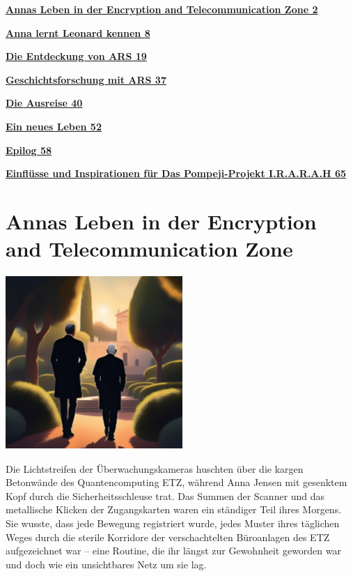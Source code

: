 \documentclass[
]{article}
\begin{document}
\hyperref[annas-leben-in-der-encryption-and-telecommunication-zone]{\textbf{Annas
Leben in der Encryption and Telecommunication Zone 2}}

\hyperref[anna-lernt-leonard-kennen]{\textbf{Anna lernt Leonard kennen
8}}

\hyperref[die-entdeckung-von-ars]{\textbf{Die Entdeckung von ARS 19}}

\hyperref[geschichtsforschung-mit-ars]{\textbf{Geschichtsforschung mit
ARS 37}}

\hyperref[die-ausreise]{\textbf{Die Ausreise 40}}

\hyperref[ein-neues-leben]{\textbf{Ein neues Leben 52}}

\hyperref[epilog]{\textbf{Epilog 58}}

\hyperref[einfluxfcsse-und-inspirationen-fuxfcr-das-pompeji-projekt-i.r.a.r.a.h]{\textbf{Einflüsse
und Inspirationen für Das Pompeji-Projekt I.R.A.R.A.H 65}}

\section{Annas Leben in der Encryption and Telecommunication
Zone}\label{annas-leben-in-der-encryption-and-telecommunication-zone}

\includegraphics[width=2.64583in,height=2.59375in]{media/image1.png}

Die Lichtstreifen der Überwachungskameras huschten über die kargen
Betonwände des Quantencomputing ETZ, während Anna Jensen mit gesenktem
Kopf durch die Sicherheitsschleuse trat. Das Summen der Scanner und das
metallische Klicken der Zugangskarten waren ein ständiger Teil ihres
Morgens. Sie wusste, dass jede Bewegung registriert wurde, jedes Muster
ihres täglichen Weges durch die sterile Korridore der verschachtelten
Büroanlagen des ETZ aufgezeichnet war -- eine Routine, die ihr längst
zur Gewohnheit geworden war und doch wie ein unsichtbares Netz um sie
lag.
\end{document}
